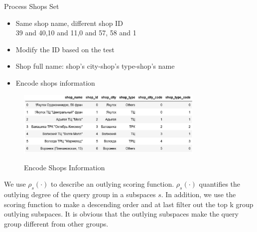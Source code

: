 \documentclass[
 size=12pt,
 paper=smartboard,  %
 mode=present, 		%
 display=slides, 	%
 style=tuliplab,  	%
 pauseslide,
 fleqn,leqno]{powerdot}
\begin{document}
\begin{slide}{Process Shops Set}

\begin{itemize}
\item
Same shop name, different shop ID \\
39 and 40,10 and 11,0 and 57, 58 and 1
\item
Modify the ID based on the test
\item
Shop full name: shop’s city-shop’s type-shop’s name
\item
Encode shops information
\end{itemize}

\vspace{0.75cm}
\begin{figure}[htbp]
  \centering
  \includegraphics[width=0.8\textwidth,height=0.3\textwidth]{figures/Figure3.eps}\\
  \caption{Encode Shops Information}
\end{figure}


\begin{note}
We use $\rho_s(\cdot)$ to describe an outlying scoring function.
$\rho_s(\cdot)$ quantifies the outlying degree of the query group in a subspaces $s$.
In addition,
we use the scoring function to make a descending order and at last
filter out the top k group outlying subspaces.
It is obvious that the outlying subspaces make the
query group different from other groups.
\end{note}

\end{slide}
\end{document}
